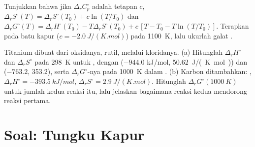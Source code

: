 \begin{exercise}[$\star\star\star$]\label{exo:b2:reaction-free-energy:11}
Tunjukkan bahwa jika $\Delta_r C^\circ_p$ adalah tetapan $c$,
$\Delta_r S^\circ(T) = \Delta_r S^\circ(T_0) + c\ln(T/T_0)$ dan
$\Delta_r G^\circ(T) = \Delta_r H^\circ(T_0) - T\Delta_r S^\circ(T_0) +
c\,[T - T_0 - T\ln(T/T_0)]$. Terapkan pada batu kapur ($c =
\qty{-2.0}{J/(K.mol)}$) pada \qty{1100}{K}, lalu ukurlah galat
.
\end{exercise}

\begin{exercise}[$\star\star\star$]\label{exo:b2:reaction-free-energy:12}
Titanium dibuat dari oksidanya, rutil, melalui kloridanya. (a) Hitunglah
$\Delta_r H^\circ$ dan $\Delta_r S^\circ$ pada \qty{298}{K} untuk
, dengan  ($-944.0$
\unit{kJ/mol}, \qty{50.62}{J/(K.mol)}) dan  ($-763.2$, 353.2),
serta $\Delta_r G^\circ$-nya pada \qty{1000}{K} dalam . (b) Karbon ditambahkan: ,
$\Delta_r H^\circ =
\qty{-393.5}{kJ/mol}$, $\Delta_r S^\circ = \qty{+2.9}{J/(K.mol)}$. Hitunglah $\Delta_r G^\circ(\qty{1000}{K})$ untuk
jumlah kedua reaksi itu, lalu jelaskan bagaimana reaksi kedua mendorong
reaksi pertama.
\end{exercise}

\section{Soal: Tungku Kapur}

